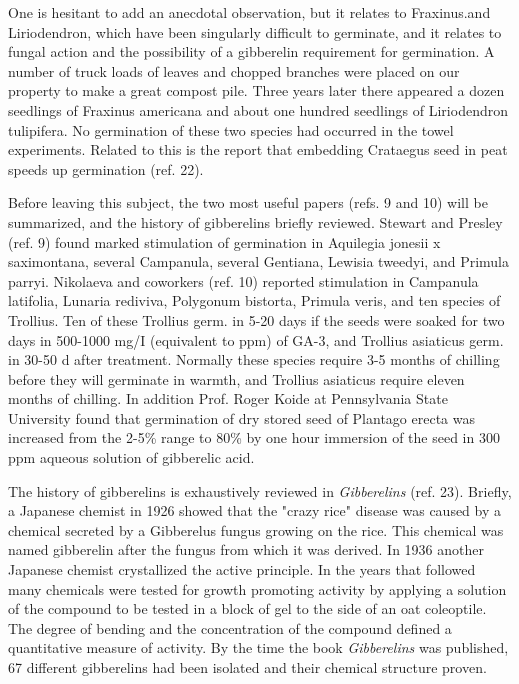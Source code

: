 One is hesitant to add an anecdotal observation, but it relates to Fraxinus.and
Liriodendron, which have been singularly difficult to germinate, and it relates to fungal
action and the possibility of a gibberelin requirement for germination. A number of
truck loads of leaves and chopped branches were placed on our property to make a
great compost pile. Three years later there appeared a dozen seedlings of Fraxinus
americana and about one hundred seedlings of Liriodendron tulipifera. No
germination of these two species had occurred in the towel experiments. Related to
this is the report that embedding Crataegus seed in peat speeds up germination (ref.
22).

Before leaving this subject, the two most useful papers (refs. 9 and 10) will be
summarized, and the history of gibberelins briefly reviewed. Stewart and Presley (ref.
9) found marked stimulation of germination in Aquilegia jonesii x saximontana, several
Campanula, several Gentiana, Lewisia tweedyi, and Primula parryi. Nikolaeva and
coworkers (ref. 10) reported stimulation in Campanula latifolia, Lunaria rediviva,
Polygonum bistorta, Primula veris, and ten species of Trollius. Ten of these Trollius
germ. in 5-20 days if the seeds were soaked for two days in 500-1000 mg/I (equivalent
to ppm) of GA-3, and Trollius asiaticus germ. in 30-50 d after treatment. Normally
these species require 3-5 months of chilling before they will germinate in warmth, and
Trollius asiaticus require eleven months of chilling. In addition Prof. Roger Koide at
Pennsylvania State University found that germination of dry stored seed of Plantago
erecta was increased from the 2-5\% range to 80\% by one hour immersion of the seed
in 300 ppm aqueous solution of gibberelic acid.

The history of gibberelins is exhaustively reviewed in \textit{Gibberelins} (ref. 23).
Briefly, a Japanese chemist in 1926 showed that the "crazy rice" disease was caused
by a chemical secreted by a Gibberelus fungus growing on the rice. This chemical
was named gibberelin after the fungus from which it was derived. In 1936 another
Japanese chemist crystallized the active principle. In the years that followed many
chemicals were tested for growth promoting activity by applying a solution of the
compound to be tested in a block of gel to the side of an oat coleoptile. The degree of
bending and the concentration of the compound defined a quantitative measure of
activity. By the time the book \textit{Gibberelins} was published, 67 different gibberelins had
been isolated and their chemical structure proven.

